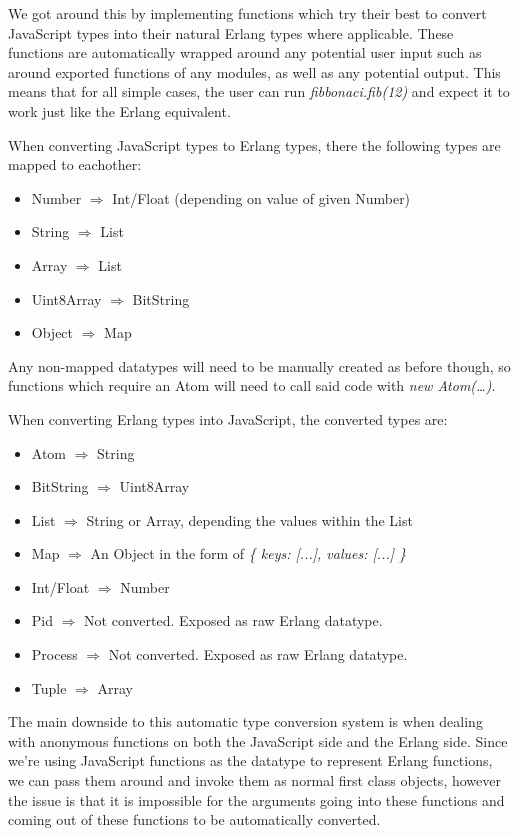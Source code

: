 \documentclass[twoside,12pt,titlepage,a4paper]{article}
\begin{document}
We got around this by implementing functions which try their best to convert JavaScript types into their natural Erlang types where applicable. These functions are automatically wrapped around any potential user input such as around exported functions of any modules, as well as any potential output. This means that for all simple cases, the user can run \textit{fibbonaci.fib(12)} and expect it to work just like the Erlang equivalent.

When converting JavaScript types to Erlang types, there the following types are mapped to eachother:

\begin{itemize}
	\item Number $\Rightarrow$ Int/Float (depending on value of given Number)
	\item String $\Rightarrow$ List
	\item Array $\Rightarrow$ List
	\item Uint8Array $\Rightarrow$ BitString
	\item Object $\Rightarrow$ Map
\end{itemize}

Any non-mapped datatypes will need to be manually created as before though, so functions which require an Atom will need to call said code with \textit{new Atom(\dots)}.

When converting Erlang types into JavaScript, the converted types are:

\begin{itemize}
	\item Atom $\Rightarrow$ String
	\item BitString $\Rightarrow$ Uint8Array
	\item List $\Rightarrow$ String or Array, depending the values within the List
	\item Map $\Rightarrow$ An Object in the form of \textit{\{ keys: [...], values: [...] \}}
	\item Int/Float $\Rightarrow$ Number
	\item Pid $\Rightarrow$ Not converted. Exposed as raw Erlang datatype.
	\item Process $\Rightarrow$ Not converted. Exposed as raw Erlang datatype.
	\item Tuple $\Rightarrow$ Array
\end{itemize}

The main downside to this automatic type conversion system is when dealing with anonymous functions on both the JavaScript side and the Erlang side. Since we're using JavaScript functions as the datatype to represent Erlang functions, we can pass them around and invoke them as normal first class objects, however the issue is that it is impossible for the arguments going into these functions and coming out of these functions to be automatically converted.
\end{document}
